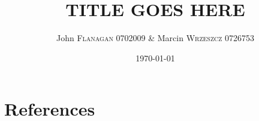 \documentclass[pdftex,11pt,a4paper]{article}
\author{John \textsc{Flanagan} 0702009 \& Marcin \textsc{Wrzeszcz} 0726753 }
\title{TITLE GOES HERE}
\date{\today}
\begin{document}

\pagebreak





\tableofcontents
\pagebreak

\pagebreak


\pagebreak


\pagebreak


\pagebreak


\pagebreak

\pagebreak
\section{References}
\def\refname{}


\end{document}
